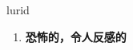 
\begin{frame}
{\huge lurid}
\begin{center}
\begin{enumerate}\Large
  \item \textbf{恐怖的，令人反感的}
\end{enumerate}
\end{center}
\end{frame}
